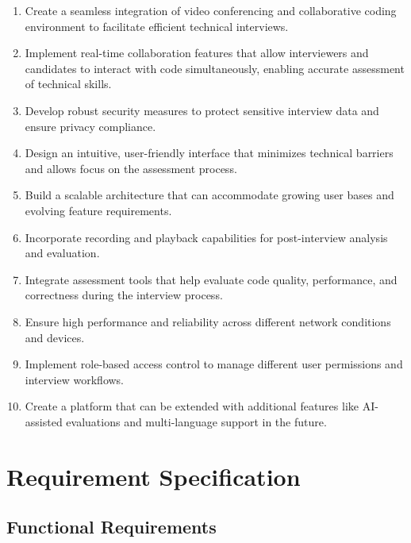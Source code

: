 \documentclass[12pt,a4paper]{report}
\begin{document}
\begin{enumerate}
    \item Create a seamless integration of video conferencing and collaborative coding environment to facilitate efficient technical interviews.

    \item Implement real-time collaboration features that allow interviewers and candidates to interact with code simultaneously, enabling accurate assessment of technical skills.

    \item Develop robust security measures to protect sensitive interview data and ensure privacy compliance.

    \item Design an intuitive, user-friendly interface that minimizes technical barriers and allows focus on the assessment process.

    \item Build a scalable architecture that can accommodate growing user bases and evolving feature requirements.

    \item Incorporate recording and playback capabilities for post-interview analysis and evaluation.

    \item Integrate assessment tools that help evaluate code quality, performance, and correctness during the interview process.

    \item Ensure high performance and reliability across different network conditions and devices.

    \item Implement role-based access control to manage different user permissions and interview workflows.

    \item Create a platform that can be extended with additional features like AI-assisted evaluations and multi-language support in the future.
\end{enumerate}

\chapter{Requirement Specification}

\section{Functional Requirements}
\end{document}
